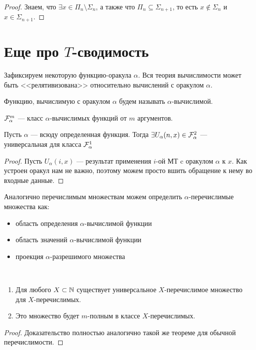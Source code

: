 \begin{proof}
    Знаем, что $ \exists x \in \Pi_n \setminus \Sigma_n$, а также что $ \Pi_n \subseteq \Sigma_{n + 1}$, то есть $ x \notin \Sigma_n$ и $ x \in \Sigma_{n + 1}$.
\end{proof}

\section{Еще про $ T$-сводимость}
Зафиксируем некоторую функцию-оракула $  \alpha $. Вся теория вычислимости может быть <<релятивизована>> относительно вычислений с оракулом $  \alpha $.
\begin{defn}
    Функцию, вычислимую с оракулом $  \alpha $ будем называть $  \alpha $-вычислимой.
\end{defn}
\begin{name}
    $ \mathcal{F}_{\alpha}^{m}$ --- класс $  \alpha $-вычислимых функций от $ m $ аргументов.
\end{name}

    \begin{thm}
        Пусть $ \alpha $ --- всюду определенная функция. Тогда 
		$
			\exists U_{ \alpha } (n, x) \in \mathcal{F}_{ \alpha} ^2
			$
		--- универсальная для класса $ \mathcal{F}^{1}_{ \alpha }$
    \end{thm}
	\begin{proof}
		Пусть $ U_{ \alpha }(i, x)$ --- результат применения $ i$-ой МТ c оракулом $  \alpha $ к $ x$.
		Как устроен оракул нам не важно, поэтому можем просто вшить обращение к нему во входные данные.
	\end{proof}

Аналогично перечислимым множествам можем определить $  \alpha$-перечислимые множества как:
\begin{itemize}
	\item область определения $  \alpha $-вычислимой функции 
	\item область значений $  \alpha $-вычислимой функции
	\item проекция  $  \alpha $-разрешимого множества
\end{itemize}

\begin{thm}
	~\begin{enumerate}
	    \item Для любого $X \subset \mathbb{N}  $ существует универсальное $ X$-перечислимое множество для $ X$-перечислимых.
		\item Это множество будет $ m$-полным в классе $ X$-перечислимых.
	\end{enumerate} 
\end{thm}
	\begin{proof}
	    Доказательство полностью аналогично такой же теореме для обычной перечислимости.
	\end{proof}

